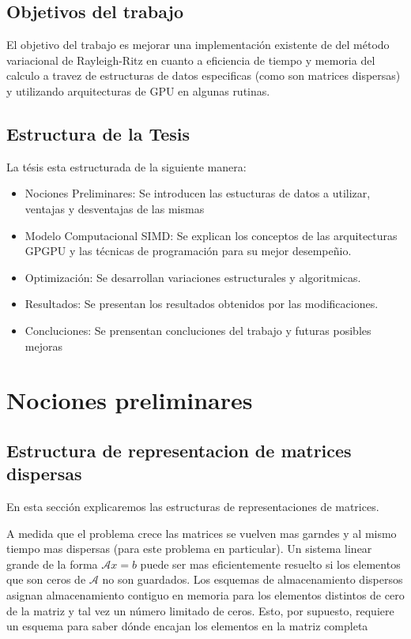 \documentclass[a4paper,openright,12pt, oneside]{book}
\begin{document}
\section{Objetivos del trabajo}

El objetivo del trabajo es mejorar una implementaci\'on existente de del m\'etodo variacional de Rayleigh-Ritz en cuanto a eficiencia de tiempo y memoria del calculo a travez de estructuras de datos especificas (como son matrices dispersas) y utilizando arquitecturas de GPU en algunas rutinas.


\section{Estructura de la Tesis}

La t\'esis esta estructurada de la siguiente manera:

\begin{itemize}
    \item Nociones Preliminares: Se introducen las estucturas de datos a utilizar, ventajas y desventajas de las mismas
    \item Modelo Computacional SIMD: Se explican los conceptos de las arquitecturas GPGPU y las t\'ecnicas de programaci\'on para su mejor desempe\~nio.
    \item Optimizaci\'on: Se desarrollan variaciones estructurales y algoritmicas. 
    \item Resultados: Se presentan los resultados obtenidos por las modificaciones.
    \item Concluciones: Se prensentan concluciones del trabajo y futuras posibles mejoras
\end{itemize}

\setcounter{chapter}{2}
\setcounter{section}{0}
\chapter*{Nociones preliminares}\label{Nociones preliminares}
\markboth{}{} %

\section{Estructura de representacion de matrices dispersas}

En esta secci\'on explicaremos las estructuras de representaciones de matrices.

A medida que el problema crece las matrices se vuelven mas garndes y al mismo tiempo mas dispersas (para este problema en particular).
Un sistema linear grande de la forma $\mathcal{A}x = b$ puede ser mas eficientemente resuelto si los elementos que son ceros de $\mathcal{A}$ no son guardados. Los esquemas de almacenamiento dispersos asignan almacenamiento contiguo en memoria para los elementos distintos de cero de la matriz y tal vez un n\'umero limitado de ceros. Esto, por supuesto, requiere un esquema para saber d\'onde encajan los elementos en la matriz completa
\end{document}
